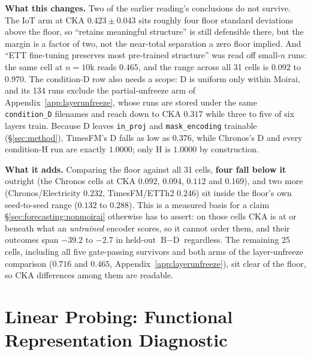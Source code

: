 \textbf{What this changes.}  Two of the earlier reading's conclusions do not
survive.  The IoT arm at CKA $0.423{\pm}0.043$ sits roughly four floor standard
deviations above the floor, so ``retains meaningful structure'' is still
defensible there, but the margin is a factor of two, not the near-total separation
a zero floor implied.  And ``ETT fine-tuning preserves most pre-trained
structure'' was read off small-$n$ runs: the same cell at $n{=}10$k reads $0.465$,
and the range across all 31 cells is $0.092$ to $0.970$.  The condition-D row also
needs a scope: D is uniform only within Moirai, and its 134 runs exclude the
partial-unfreeze arm of Appendix~\ref{app:layerunfreeze}, whose runs are stored
under the same \texttt{condition\_D} filenames and reach down to CKA $0.317$
while three to five of six layers train.  Because D leaves \texttt{in\_proj}
and \texttt{mask\_encoding} trainable (\S\ref{sec:method}), TimesFM's D falls as
low as $0.376$, while Chronos's D and every condition-H run are exactly $1.0000$;
only H is $1.0000$ by construction.

\textbf{What it adds.}  Comparing the floor against all 31 cells,
\textbf{four fall below it} outright (the Chronos cells at
CKA $0.092$, $0.094$, $0.112$ and $0.169$), and two more (Chronos/Electricity
$0.232$, TimesFM/ETTh2 $0.246$) sit inside the floor's own seed-to-seed range
($0.132$ to $0.288$).  This is a measured basis for a claim
\S\ref{sec:forecasting:nonmoirai} otherwise has to assert: on those cells CKA is
at or beneath what an \emph{untrained} encoder scores, so it cannot order them,
and their outcomes span $-39.2$ to $-2.7$ in held-out $\text{B}{-}\text{D}$
regardless.  The remaining 25 cells, including all five gate-passing survivors and
both arms of the layer-unfreeze comparison ($0.716$ and $0.465$,
Appendix~\ref{app:layerunfreeze}), sit clear of the floor, so CKA differences
among them are readable.

\section{Linear Probing: Functional Representation Diagnostic}
\label{app:probing}

\noindent{}
\vspace{1em}

